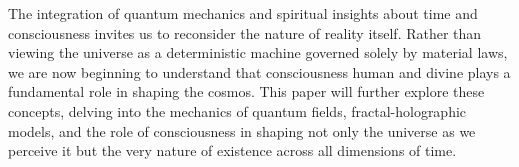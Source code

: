 
The integration of quantum mechanics and spiritual insights about time and consciousness invites us to reconsider the nature of reality itself. Rather than viewing the universe as a deterministic machine governed solely by material laws, we are now beginning to understand that consciousness human and divine plays a fundamental role in shaping the cosmos. This paper will further explore these concepts, delving into the mechanics of quantum fields, fractal-holographic models, and the role of consciousness in shaping not only the universe as we perceive it but the very nature of existence across all dimensions of time.
